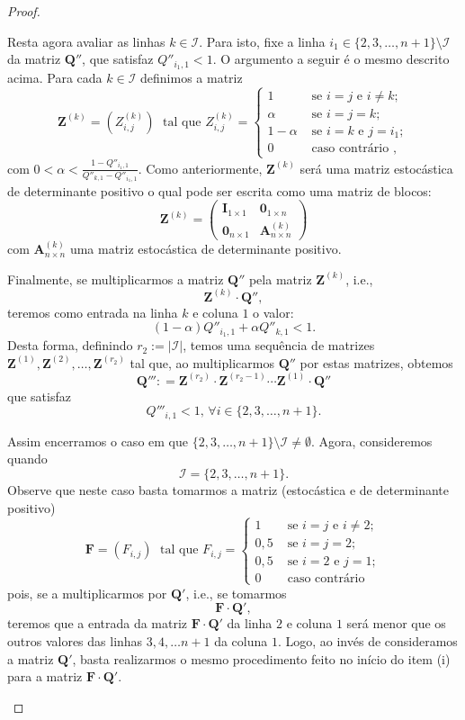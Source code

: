 \documentclass[twoside,openright,titlepage,numbers=noenddot,headinclude,  lineheaders footinclude=true,cleardoublepage=empty,
                                BCOR=5mm,paper=a4,fontsize=12pt ]{scrbook}
\theoremstyle{definition}
\begin{document}
\begin{proof}
\begin{enumerate}[(i)]
Resta agora avaliar as linhas $k \in \mathcal{I}$.
Para isto, fixe a linha $i_1 \in
 \{2, 3, \ldots, n+1\} \setminus \mathcal{I} $ da matriz 
$\mathbf{Q''}$, que satisfaz $Q''_{i_1, 1} < 1$.
O argumento a seguir é o mesmo descrito acima. 
Para cada $k \in \mathcal{I}$
definimos a matriz
\[
\mathbf{Z}^{(k)} = \left(Z^{(k)}_{i,j}\right) \;
\text{ tal que }
Z^{(k)}_{i,j} = 
\begin{cases}
1 & \text{ se } i = j \text{ e } i \neq k;\\
\alpha &\text{ se } i = j = k;\\
1 - \alpha & \text{ se } i = k \text{ e } j = i_1;\\
0 & \text{ caso contrário },
\end{cases}
\]
com $ 0 < \alpha < \frac{1 - Q''_{i_1, 1}}{Q''_{k,1} - 
Q''_{i_1,1}}$. Como anteriormente, $\mathbf{Z}^{(k)}$
será uma matriz estocástica de determinante positivo
o qual pode ser escrita como uma matriz de blocos:
\[
\mathbf{Z}^{(k)} = 
\begin{pmatrix}
 \mathbf{I}_{1 \times 1} &  \mathbf{0}_{1 \times n}\\
\mathbf{0}_{n \times 1} & \mathbf{A}^{(k)}_{n \times n}
\end{pmatrix}
\]
com $\mathbf{A}^{(k)}_{n \times n}$ uma matriz estocástica 
de determinante positivo. 

Finalmente, se multiplicarmos a matriz $\mathbf{Q''}$
pela matriz $\mathbf{Z}^{(k)}$, i.e.,
\[
	\mathbf{Z}^{(k)} \cdot \mathbf{Q''},
\]
teremos como entrada na linha $k$ e coluna $1$ o
valor:
\[
(1 - \alpha) Q''_{i_1,1} + \alpha Q''_{k,1} < 1.
\]
Desta forma, definindo $r_2 := | \mathcal{I} |$,
temos uma sequência de matrizes $\mathbf{Z}^{(1)},
\mathbf{Z}^{(2)}, \ldots, \mathbf{Z}^{(r_2)}$ tal
que, ao multiplicarmos $\mathbf{Q''}$ por estas matrizes, obtemos
\[
\mathbf{Q'''} : = 
\mathbf{Z}^{(r_2)} \cdot \mathbf{Z}^{(r_2 - 1)}  \cdots
 \mathbf{Z}^{(1)} \cdot \mathbf{Q''} 
\]
que satisfaz
\[
Q'''_{i,1} < 1, \, \forall i \in \{2, 3, \ldots, n+1\}.
\]

Assim encerramos o caso em que 
$\{2, 3, \ldots, n+1\} \setminus \mathcal{I}
\neq \emptyset$. Agora, consideremos quando
\[
\mathcal{I} = \{2, 3, \ldots, n+1\}.
\]
Observe que neste caso basta tomarmos a matriz (estocástica
e de determinante positivo)
\[
\mathbf{F} = (F_{i,j}) \;
\text{ tal que }
F_{i,j} = 
\begin{cases}
1 & \text{ se } i = j \text{ e } i \neq 2;\\
0,5 &\text{ se } i = j = 2;\\
0,5 & \text{ se } i = 2 \text{ e } j = 1;\\
0 & \text{ caso contrário }
\end{cases}
\]
pois, se a multiplicarmos por $\mathbf{Q'}$, i.e., se tomarmos
\[
\mathbf{F} \cdot \mathbf{Q'},
\]
teremos que a entrada da matriz $\bm{F} \cdot \bm{Q}'$ da linha $2$ e coluna $1$ será
menor que os outros valores das linhas $3, 4, \ldots
n+1$ da coluna $1$. Logo, ao invés de consideramos
a matriz $\mathbf{Q'}$, basta realizarmos o mesmo
procedimento feito no início do item (i) para a matriz 
$\mathbf{F} \cdot \mathbf{Q'}$.


\end{enumerate}
\end{proof}
\end{document}

